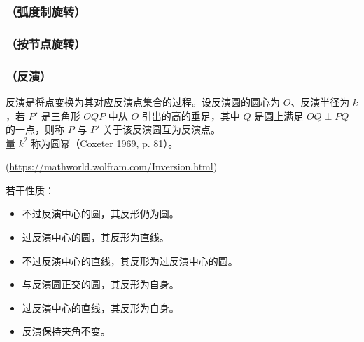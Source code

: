 \subsubsection{（弧度制旋转）} 
\begin{tkzexample}[latex=6cm,small]
\end{tkzexample} 

\subsubsection{（按节点旋转）} 
\begin{tkzexample}[latex=6cm,small]
\end{tkzexample} 

\subsubsection{（反演）} 

反演是将点变换为其对应反演点集合的过程。设反演圆的圆心为 $O$、反演半径为 $k$，若 $P'$ 是三角形 $OQP$ 中从 $O$ 引出的高的垂足，其中 $Q$ 是圆上满足 $OQ \perp PQ$ 的一点，则称 $P$ 与 $P'$ 关于该反演圆互为反演点。\\
量 $k^2$ 称为圆幂（Coxeter 1969, p. 81）。
 
(\url{https://mathworld.wolfram.com/Inversion.html})

若干性质：
\begin{itemize}
\item 不过反演中心的圆，其反形仍为圆。
\item 过反演中心的圆，其反形为直线。
\item 不过反演中心的直线，其反形为过反演中心的圆。
\item 与反演圆正交的圆，其反形为自身。
\item 过反演中心的直线，其反形为自身。
\item 反演保持夹角不变。
\end{itemize}

